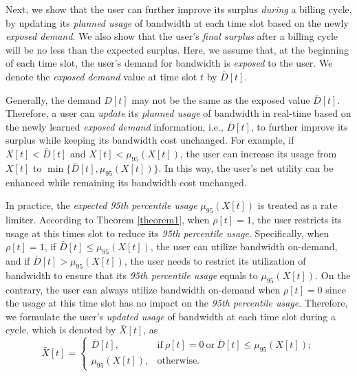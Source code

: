 \documentclass[10pt,journal,compsoc]{IEEEtran}
\begin{document}
Next, we show that the user can further improve its surplus \emph{during} a billing cycle, by updating its \emph{planned usage} of bandwidth at each time slot based on the newly \emph{exposed demand}. We also show that the user's \emph{final surplus} after a billing cycle  will be no less  than the  expected surplus.
Here, we assume that, at the beginning of each time slot, the user's demand for bandwidth  is \emph{exposed} to the user. We denote the \emph{exposed demand} value at time slot $t$ by $\bar{D}[t]$.   


Generally, the demand $D[t]$ may not be the same as the exposed value $\bar{D}[t]$. 
Therefore, a user can \emph{update} its \emph{planned usage} of bandwidth in real-time based on the newly learned \emph{exposed demand} information, i.e.,  $\bar{D}[t]$, to further improve its surplus while keeping its bandwidth cost unchanged. For example, if $X[t]< \bar{D}[t]$ and $X[t] <\mu_{95}(X[t])$, the user can increase its usage from $X[t]$ to $\min \{\bar{D}[t],\mu_{95}(X[t])\}$. In this way, the user's net utility can be enhanced while remaining its bandwidth cost unchanged.

In practice, the  \emph{expected} \emph{95th percentile usage} $\mu_{95}(X[t])$ is treated as a rate limiter. According to Theorem \ref{theorem1}, when $\rho[t]=1$, the user restricts its usage at this times slot to reduce its \emph{95th percentile usage}. Specifically, when $\rho[t]=1$, if $\bar{D}[t] \leq \mu_{95}(X[t])$, the user can utilize bandwidth on-demand, and if $\bar{D}[t] > \mu_{95}(X[t])$, the user needs to restrict its  utilization of bandwidth to ensure that its \emph{95th percentile usage} equals to $\mu_{95}(X[t])$. On the contrary, the user can always utilize bandwidth on-demand when $\rho[t]=0$ since the usage at this time slot has no impact on the \emph{95th percentile usage}.
Therefore, we formulate the user's \emph{updated usage} of bandwidth at each time slot during a cycle, which is denoted by $\bar{X}[t]$, as
\begin{equation}\label{equ:realusage}
\bar{X}[t]=
\begin{cases}
\bar{D}[t], &  \text{if} \ \rho[t]=0 \ \text{or} \ \bar{D}[t]\leq \mu_{95}(X[t]);\\
\mu_{95}(X[t]), & \text{otherwise}.
\end{cases}
\end{equation}
\end{document}
